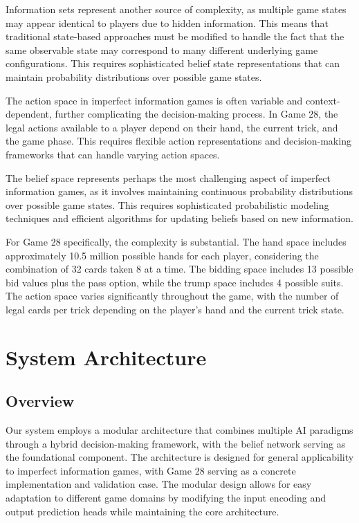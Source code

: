 \documentclass[conference]{IEEEtran}
\begin{document}
Information sets represent another source of complexity, as multiple game states may appear identical to players due to hidden information. This means that traditional state-based approaches must be modified to handle the fact that the same observable state may correspond to many different underlying game configurations. This requires sophisticated belief state representations that can maintain probability distributions over possible game states.

The action space in imperfect information games is often variable and context-dependent, further complicating the decision-making process. In Game 28, the legal actions available to a player depend on their hand, the current trick, and the game phase. This requires flexible action representations and decision-making frameworks that can handle varying action spaces.

The belief space represents perhaps the most challenging aspect of imperfect information games, as it involves maintaining continuous probability distributions over possible game states. This requires sophisticated probabilistic modeling techniques and efficient algorithms for updating beliefs based on new information.

For Game 28 specifically, the complexity is substantial. The hand space includes approximately 10.5 million possible hands for each player, considering the combination of 32 cards taken 8 at a time. The bidding space includes 13 possible bid values plus the pass option, while the trump space includes 4 possible suits. The action space varies significantly throughout the game, with the number of legal cards per trick depending on the player's hand and the current trick state.

\section{System Architecture}

\subsection{Overview}

Our system employs a modular architecture that combines multiple AI paradigms through a hybrid decision-making framework, with the belief network serving as the foundational component. The architecture is designed for general applicability to imperfect information games, with Game 28 serving as a concrete implementation and validation case. The modular design allows for easy adaptation to different game domains by modifying the input encoding and output prediction heads while maintaining the core architecture.
\end{document}
